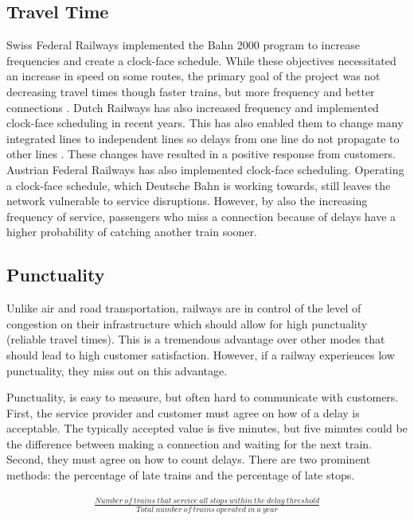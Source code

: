 \documentclass{article}
\begin{document}
\subsection{Travel Time}
Swiss Federal Railways implemented the Bahn 2000 program to increase frequencies and create a clock-face schedule. While these objectives necessitated an increase in speed on some routes, the primary goal of the project was not decreasing travel times though faster trains, but more frequency and better connections \citep[Page 5]{laube2008}. Dutch Railways has also increased frequency and implemented clock-face scheduling in recent years. This has also enabled them to change many integrated lines to independent lines so delays from one line do not propagate to other lines \citep{ns-railway}. These changes have resulted in a positive response from customers. Austrian Federal Railways has also implemented clock-face scheduling. Operating a clock-face schedule, which Deutsche Bahn is working towards, still leaves the network vulnerable to service disruptions. However, by also the increasing frequency of service, passengers who miss a connection because of delays have a higher probability of catching another train sooner.

\subsection{Punctuality}
Unlike air and road transportation, railways are in control of the level of congestion on their infrastructure which should allow for high punctuality (reliable travel times). This is a tremendous advantage over other modes that should lead to high customer satisfaction. However, if a railway experiences low punctuality, they miss out on this advantage.

Punctuality, is easy to measure, but often hard to communicate with customers. First, the service provider and customer must agree on how of a delay is acceptable. The typically accepted value is five minutes, but five minutes could be the difference between making a connection and waiting for the next train. Second, they must agree on how to count delays. There are two prominent methods: the percentage of late trains and the percentage of late stops.

\begin{align}
\frac{Number\ of\ trains\ that\ service\ all\ stops\ within\ the\ delay\ threshold}{Total\ number\ of\ trains\ operated\ in\ a\ year}
\end{align}
\end{document}
